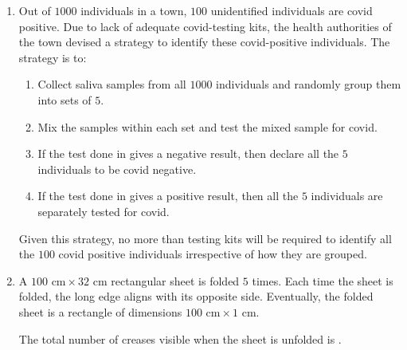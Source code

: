 \documentclass[a4paper, 11pt]{article}
\begin{document}
\begin{enumerate}
    \hfill{}
    
    \item Out of $1000$ individuals in a town, $100$ unidentified individuals are covid positive. Due to lack of adequate covid-testing kits, the health authorities of the town devised a strategy to identify these covid-positive individuals. The strategy is to:
    \begin{enumerate}[label=\brak{\roman*}]
        \item Collect saliva samples from all $1000$ individuals and randomly group them into sets of $5$.
        \item Mix the samples within each set and test the mixed sample for covid.
        \item If the test done in  gives a negative result, then declare all the $5$ individuals to be covid negative.
        \item If the test done in  gives a positive result, then all the $5$ individuals are separately tested for covid.
    \end{enumerate}
    Given this strategy, no more than \underline{\hspace{2cm}} testing kits will be required to identify all the $100$ covid positive individuals irrespective of how they are grouped.
    
    \begin{enumerate}
    \end{enumerate}

    \hfill{}
    
    \item A $100\text{ cm} \times 32\text{ cm}$ rectangular sheet is folded $5$ times. Each time the sheet is folded, the long edge aligns with its opposite side. Eventually, the folded sheet is a rectangle of dimensions $100\text{ cm} \times 1\text{ cm}$.
    
    The total number of creases visible when the sheet is unfolded is \underline{\hspace{2cm}}.
    
    \begin{enumerate}
    \end{enumerate}

    \hfill{}

\end{enumerate}
\end{document}
